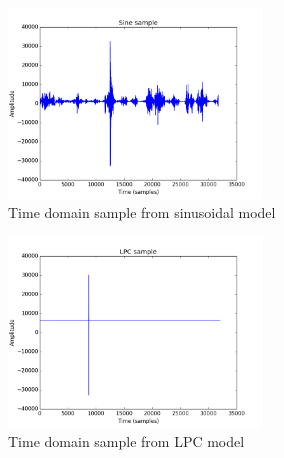 \documentclass{article} %
\begin{document}
\begin{figure}[h!]
    \centering
    \includegraphics[width=0.6\textwidth,height=0.5\textwidth]{sine_sample.png}
    \caption{Time domain sample from sinusoidal model}
    \label{fig:sine_sample}
\end{figure}

\begin{figure}[h!]
    \centering
    \includegraphics[width=0.6\textwidth,height=0.5\textwidth]{lpc_sample.png}
    \caption{Time domain sample from LPC model}
    \label{fig:lpc_sample}
\end{figure}
\end{document}
